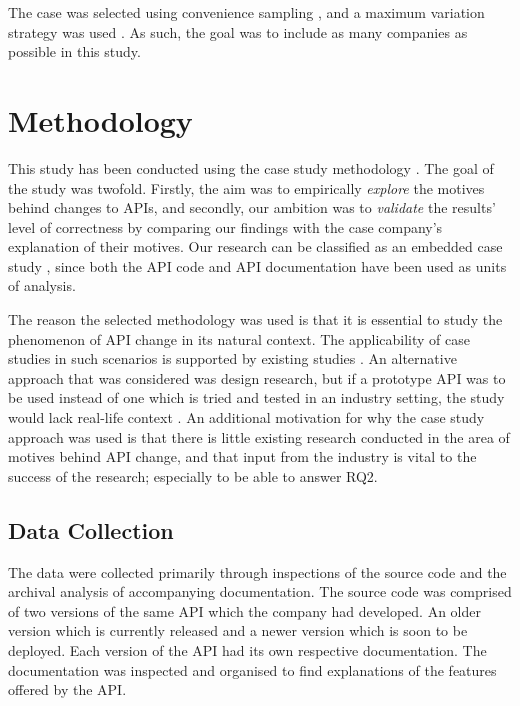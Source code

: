 \documentclass[10pt,twocolumn]{article}
\begin{document}
The case was selected using convenience sampling \cite{flyvbjerg2006five}, and a maximum variation strategy was used \cite{benbasat1987case}. As such, the goal was to include as many companies as possible in this study.



\section{Methodology}
This study has been conducted using the case study methodology \cite{runeson2009guidelines}. The goal of the study was twofold. Firstly, the aim was to empirically \textit{explore} the motives behind changes to APIs, and secondly, our ambition was to \textit{validate} the results' level of correctness by comparing our findings with the case company's explanation of their motives. Our research can be classified as an embedded case study \cite{yin2013case}, since both the API code and API documentation have been used as units of analysis. 

The reason the selected methodology was used is that it is essential to study the phenomenon of API change in its natural context. The applicability of case studies in such scenarios is supported by existing studies \cite{runeson2009guidelines} \cite{benbasat1987case} \cite{yin2013case} \cite{robson2002real}. An alternative approach that was considered was design research, but if a prototype API was to be used instead of one which is tried and tested in an industry setting, the study would lack real-life context \cite{runeson2009guidelines}. An additional motivation for why the case study approach was used is that there is little existing research conducted in the area of motives behind API change, and that input from the industry is vital to the success of the research; especially to be able to answer RQ2. 

\subsection{Data Collection}
The data were collected primarily through inspections of the source code and the archival analysis of accompanying  documentation. The source code was comprised of two versions of the same API which the company had developed. An older version which is currently released and a newer version which is soon to be deployed. Each version of the API had its own respective documentation. The documentation was inspected and organised to find explanations of the features offered by the API.
\end{document}
